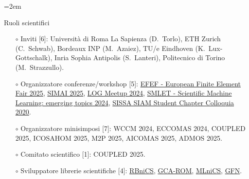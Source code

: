 \documentclass[
  usegeometry%
]{scrartcl}
\newcommand{\Description}[1]{\hangindent=2em\hangafter=0\noindent\raggedright\footnotesize{#1}\par\normalsize\vspace{1em}} %
\begin{document}
\begin{cv}{}
\newpage
\Description{{\color{cyan} Ruoli scientifici}
\begin{itemize}
    \item[$\circ$] Inviti [6]: Università di Roma La Sapienza (D.\ Torlo), ETH Zurich (C.\ Schwab), Bordeaux INP (M.\ Azaiez), TU/e Eindhoven (K.\ Lux-Gottschalk), Inria Sophia Antipolis (S.\ Lanteri), Politecnico di Torino (M.\ Strazzullo).
    \item[$\circ$] Organizzatore conferenze/workshop [5]: \href{https://indico.sissa.it/event/153/}{EFEF - European Finite Element Fair 2025}, \href{https://simai2025.cimne.com}{SIMAI 2025}, \href{https://sites.google.com/student.unisi.it/log24siena/home-page}{LOG Meetup 2024}, \href{https://indico.sissa.it/event/107/}{SMLET - Scientific Machine Learning: emerging topics 2024}, \href{https://www.math.sissa.it/seminar/siam-chapter-colloquia-2020}{SISSA SIAM Student Chapter Colloquia 2020}.
    \item[$\circ$] Organizzatore minisimposi [7]: WCCM 2024, ECCOMAS 2024, COUPLED 2025, ICOSAHOM 2025, M2P 2025, AICOMAS 2025, ADMOS 2025.
    \item[$\circ$] Comitato scientifico [1]:  COUPLED 2025.
    \item[$\circ$] Sviluppatore librerie scientifiche [4]: \href{https://github.com/RBniCS/RBniCS}{RBniCS}, \href{https://github.com/fpichi/gca-rom}{GCA-ROM}, \href{https://github.com/MLniCS/MLniCS}{MLniCS}, \href{https://github.com/Oisin-M/GFN}{GFN}. 

\end{itemize}}
\end{cv}
\end{document}
